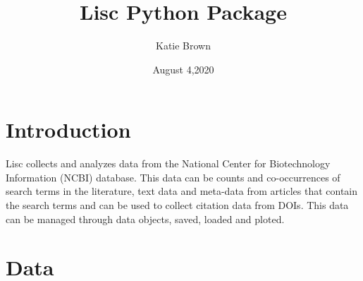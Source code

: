 \documentclass[12pt, letterpaper]{article}
\title{Lisc Python Package}
\author{Katie Brown}
\date{August 4,2020}
\begin{document}
\maketitle

\section{Introduction}

Lisc collects and analyzes data from the National Center for Biotechnology Information (NCBI) database. This data can be counts and co-occurrences of search terms in the literature, text data and meta-data from articles that contain the search terms and can be used to collect citation data from DOIs. This data can be managed through data objects, saved, loaded and ploted.

\section{Data}
\end{document}

